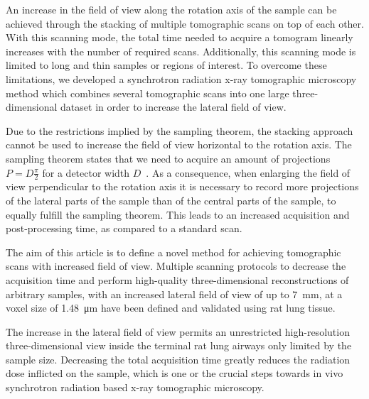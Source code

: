 An increase in the field of view along the rotation axis of the sample can be achieved through the stacking of multiple tomographic scans on top of each other. With this scanning mode, the total time needed to acquire a tomogram linearly increases with the number of required scans. Additionally, this scanning mode is limited to long and thin samples or regions of interest. To overcome these limitations, we developed a synchrotron radiation x-ray tomographic microscopy method which combines several tomographic scans into one large three-dimensional dataset in order to increase the lateral field of view.

Due to the restrictions implied by the sampling theorem, the stacking approach cannot be used to increase the field of view horizontal to the rotation axis. The sampling theorem states that we need to acquire an amount of projections $P=D\frac{\pi}{2}$ for a detector width $D$~\cite[page 186]{Kak2002}. As a consequence, when enlarging the field of view perpendicular to the rotation axis it is necessary to record more projections of the lateral parts of the sample than of the central parts of the sample, to equally fulfill the sampling theorem. This leads to an increased acquisition and post-processing time, as compared to a standard scan.

The aim of this article is to define a novel method for achieving tomographic scans with increased field of view. Multiple scanning protocols to decrease the acquisition time and perform high-quality three-dimensional reconstructions of arbitrary samples, with an increased lateral field of view of up to \SI{7}{\milli\meter}, at a voxel size of \SI{1.48}{\micro\meter} have been defined and validated using rat lung tissue.

The increase in the lateral field of view permits an unrestricted high-resolution three-dimensional view inside the terminal rat lung airways only limited by the sample size. Decreasing the total acquisition time greatly reduces the radiation dose inflicted on the sample, which is one or the crucial steps towards in vivo synchrotron radiation based x-ray tomographic microscopy.